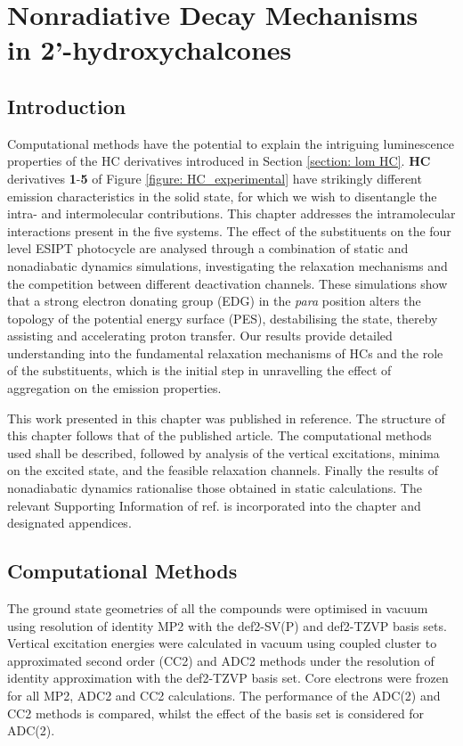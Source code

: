 \chapter[Nonradiative Decay Mechanisms in 2'-hydroxychalcones]{Nonradiative Decay Mechanisms\\ in 2'-hydroxychalcones}
\label{chapter:NRdecay}
\section{Introduction}\label{section: NRdecay_intro}
Computational methods have the potential to explain the intriguing luminescence properties of the \acf{HC} derivatives introduced in Section \ref{section: lom HC}. \textbf{HC} derivatives \textbf{1}-\textbf{5} of Figure \ref{figure: HC_experimental} have strikingly different emission characteristics in the solid state, for which we wish to disentangle the intra- and intermolecular contributions. This chapter addresses the intramolecular interactions present in the five systems. The effect of the substituents on the four level \ac{ESIPT} photocycle are analysed through a combination of static and nonadiabatic dynamics simulations, investigating the relaxation mechanisms and the competition between different deactivation channels. These simulations show that a strong electron donating group (EDG) in the \textit{para} position alters the topology of the potential energy surface (PES), destabilising the \Estar{} state, thereby assisting and accelerating proton transfer. Our results provide detailed understanding into the fundamental relaxation mechanisms of \ac{HC}s and the role of the substituents, which is the initial step in unravelling the effect of aggregation on the emission properties.

This work presented in this chapter was published in reference. The structure of this chapter follows that of the published article. The computational methods used shall be described, followed by analysis of the vertical excitations, minima on the excited state, and the feasible relaxation channels. Finally the results of nonadiabatic dynamics rationalise those obtained in static calculations. The relevant Supporting Information of ref. is incorporated into the chapter and designated appendices.

\section{Computational Methods}\label{section: NRdecay_methods}
The ground state geometries of all the compounds were optimised in vacuum using resolution of identity \acf{MP2} with the def2-SV(P) and def2-TZVP basis sets.\cite{Haase1993,Schafer1992,Weigend2005} Vertical excitation energies were calculated in vacuum using coupled cluster to approximated second order (CC2) and \acf{ADC2} methods under the resolution of identity approximation with the def2-TZVP basis set.\cite{Christiansen1995,Hattig2000,Hattig2002,Kohn2003,Hattig2005} Core electrons were frozen for all \ac{MP2}, \ac{ADC2} and CC2 calculations. The performance of the ADC(2) and CC2 methods is compared, whilst the effect of the basis set is considered for ADC(2). 

